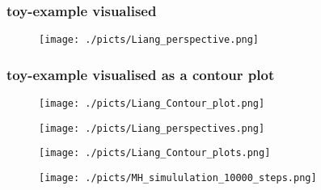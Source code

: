 \begin{frame}
		\frametitle{toy-example visualised}
	
	\begin{center}
		\begin{figure}\texttt{[image: ./picts/Liang\_perspective.png]}\end{figure}	
	\end{center}	
		
\end{frame}

\begin{frame}
		\frametitle{toy-example visualised as a contour plot}
	
	\begin{center}
		\begin{figure}\texttt{[image: ./picts/Liang\_Contour\_plot.png]}\end{figure}	
	\end{center}	
		
\end{frame}


\begin{frame}[plain]

	\begin{center}
		\begin{figure}\texttt{[image: ./picts/Liang\_perspectives.png]}\end{figure}	
	\end{center}	
		
\end{frame}


\begin{frame}[plain]

	\begin{center}
		\begin{figure}\texttt{[image: ./picts/Liang\_Contour\_plots.png]}\end{figure}	
	\end{center}	
		
\end{frame}


\begin{frame}[plain]

	\begin{center}
		\begin{figure}\texttt{[image: ./picts/MH\_simululation\_10000\_steps.png]}\end{figure}	
	\end{center}	
		
\end{frame}

